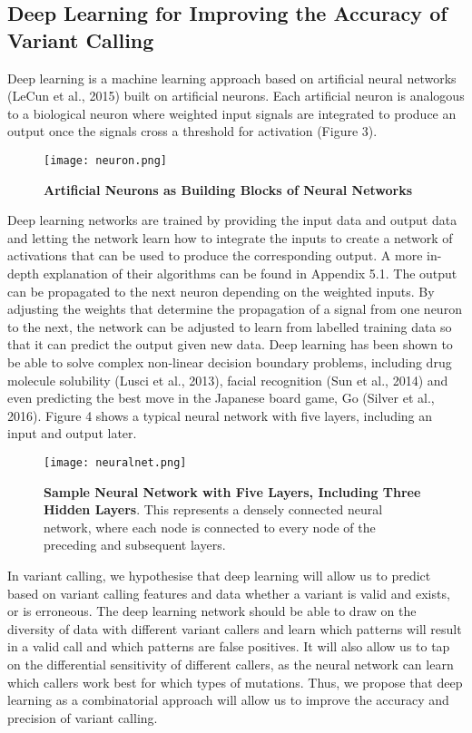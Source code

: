 \documentclass{article}
\begin{document}
\subsection{Deep Learning for Improving the Accuracy of Variant Calling} 
Deep learning is a machine learning approach based on artificial neural networks (LeCun et al., 2015) built on artificial neurons. Each artificial neuron is analogous to a biological neuron where weighted input signals are integrated to produce an output once the signals cross a threshold for activation (Figure 3).  
\begin{figure}[H]
\texttt{[image: neuron.png]}
\centering
\caption{\textbf{Artificial Neurons as Building Blocks of Neural Networks}}
\end{figure}
Deep learning networks are trained by providing the input data and output data and letting the network learn how to integrate the inputs to create a network of activations that can be used to produce the corresponding output. A more in-depth explanation of their algorithms can be found in Appendix 5.1. 
The output can be propagated to the next neuron depending on the weighted inputs.
By adjusting the weights that determine the propagation of a signal from one neuron to the next, the network can be adjusted to learn from labelled training data so that it can predict the output given new data.
Deep learning has been shown to be able to solve  complex non-linear decision boundary problems, including drug molecule solubility (Lusci et al., 2013), facial recognition (Sun et al., 2014) and even predicting the best move in the Japanese board game, Go (Silver et al., 2016). Figure 4 shows a typical neural network with five layers, including an input and output later.
\begin{figure}[H]
\texttt{[image: neuralnet.png]}
\centering
\caption{\textbf{Sample Neural Network with Five Layers, Including Three Hidden Layers}. This represents a densely connected neural network, where each node is connected to every node of the preceding and subsequent layers.}
\end{figure}
In variant calling, we hypothesise that deep learning will allow us to predict based on variant calling features and data whether a variant is valid and exists, or is erroneous. The deep learning network should be able to draw on the diversity of data with different variant callers and learn which patterns will result in a valid call and which patterns are false positives. It will also allow us to tap on the differential sensitivity of different callers, as the neural network can learn which callers work best for which types of mutations. Thus, we propose that deep learning as a combinatorial approach will allow us to improve the accuracy and precision of variant calling.
\end{document}
